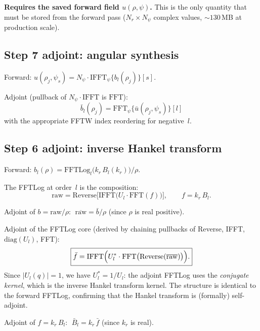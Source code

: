 \documentclass[11pt,a4paper]{article}
\begin{document}
\textbf{Requires the saved forward field $u(\rho,\psi)$.}
This is the only quantity that must be stored from the forward pass
($N_r \times N_\psi$ complex values, ${\sim}130$\,MB at production scale).


\subsection{Step 7 adjoint: angular synthesis}

Forward: $u(\rho_j,\psi_s) = N_\psi\cdot\mathrm{IFFT}_\psi\{b_l(\rho_j)\}[s]$.

Adjoint (pullback of $N_\psi\cdot\mathrm{IFFT}$ is $\mathrm{FFT}$):
\begin{equation}\label{eq:adj_synth}
  \bar b_l(\rho_j) = \mathrm{FFT}_\psi\{\bar u(\rho_j,\psi_s)\}[l]
\end{equation}
with the appropriate FFTW index reordering for negative~$l$.


\subsection{Step 6 adjoint: inverse Hankel transform}

Forward: $b_l(\rho) = \mathrm{FFTLog}_l\bigl(k_r\,B_l(k_r)\bigr)\big/\rho$.

The FFTLog at order~$l$ is the composition:
\begin{equation}
  \mathrm{raw} = \mathrm{Reverse}\bigl[\mathrm{IFFT}\bigl(
    U_l \cdot \mathrm{FFT}(f)\bigr)\bigr],
  \qquad f = k_r\,B_l.
\end{equation}

Adjoint of $b = \mathrm{raw}/\rho$: $\;\overline{\mathrm{raw}} = \bar b / \rho$
\quad(since $\rho$ is real positive).

Adjoint of the FFTLog core (derived by chaining pullbacks of Reverse, IFFT,
$\mathrm{diag}(U_l)$, FFT):
\begin{equation}\label{eq:adj_fftlog}
\boxed{
  \bar f = \mathrm{IFFT}\Bigl(
    U_l^* \cdot \mathrm{FFT}\bigl(\mathrm{Reverse}(\overline{\mathrm{raw}})\bigr)
  \Bigr).
}
\end{equation}
Since $|U_l(q)| = 1$, we have $U_l^* = 1/U_l$: the adjoint FFTLog uses the
\emph{conjugate kernel}, which is the inverse Hankel transform kernel.
The structure is identical to the forward FFTLog, confirming that the
Hankel transform is (formally) self-adjoint.

Adjoint of $f = k_r\,B_l$: $\;\bar B_l = k_r\,\bar f$
\quad(since $k_r$ is real).
\end{document}
